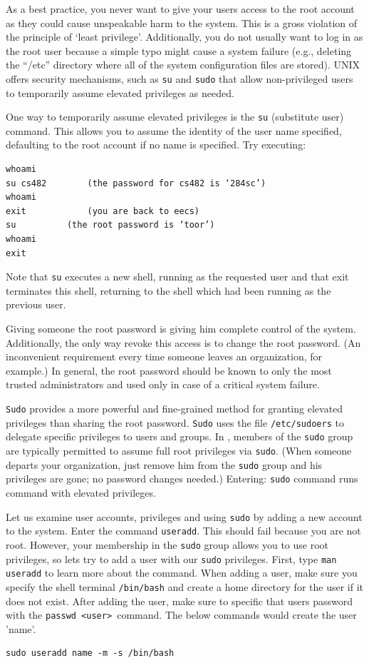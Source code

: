 \documentclass{article}
\begin{document}
As a best practice, you never want to give your users access to the root account as they could cause unspeakable harm to the system. This is a gross violation of the principle of ‘least privilege’.  Additionally, you do not usually want to log in as the root user because a simple typo might cause a system failure (e.g., deleting the “/etc” directory where all of the system configuration files are stored). UNIX offers security mechanisms, such as {\tt su} and {\tt sudo} that allow non-privileged users to temporarily assume elevated privileges as needed. 

One way to temporarily assume elevated privileges is the {\tt su} (substitute user) command. This allows you to assume the identity of the user name specified, defaulting to the root account if no name is specified. Try executing:
\begin{verbatim}
whoami
su cs482		(the password for cs482 is ‘284sc’)
whoami
exit			(you are back to eecs)
su 			(the root password is ‘toor’)
whoami
exit
\end{verbatim}

Note that {\tt su} executes a new shell, running as the requested user and that exit terminates this shell, returning to the shell which had been running as the previous user.

Giving someone the root password is giving him complete control of the system. Additionally, the only way revoke this access is to change the root password. (An inconvenient requirement every time someone leaves an organization, for example.) In general, the root password should be known to only the most trusted administrators and used only in case of a critical system failure.

{\tt Sudo} provides a more powerful and fine-grained method for granting elevated privileges than sharing the root password. {\tt    Sudo} uses the file {\tt /etc/sudoers} to delegate specific privileges to users and groups. In \ubuntu, members of the {\tt sudo} group are typically permitted to assume full root privileges via {\tt sudo}. (When someone departs your organization, just remove him from the {\tt sudo} group and his privileges are gone; no password changes needed.)  Entering: {\tt sudo} command runs command with elevated privileges.

Let us examine user accounts, privileges and using {\tt sudo} by adding a new account to the system. Enter the command {\tt useradd}. This should fail because you are not root. However, your membership in the {\tt sudo} group allows you to use root privileges, so lets try to add a user with our {\tt sudo} privileges. First, type {\tt man useradd} to learn more about the command. When adding a user, make sure you specify the shell terminal {\tt /bin/bash} and create a home directory for the user if it does not exist. After adding the user, make sure to specific that users password with the {\tt passwd <user> }command. The below commands would create the user 'name'.
\begin{verbatim}
sudo useradd name -m -s /bin/bash
\end{verbatim}
\end{document}
